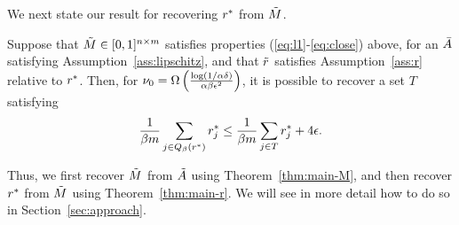 We next state our result for recovering $r^*$ from $\tilde{M}$.
\begin{theorem}
\label{thm:main-r}
Suppose that $\tilde{M} \in [0,1]^{n \times m}$ satisfies properties 
(\ref{eq:l1}-\ref{eq:close}) above, for an $\bar{A}$ satisfying 
Assumption~\ref{ass:lipschitz}, and that $\tilde{r}$ satisfies Assumption~\ref{ass:r} 
relative to $r^*$. Then, for 
$\nu_0 = \Omega\left( \frac{\log(1/\alpha\delta)}{\alpha\beta\epsilon^2} \right)$, 
it is possible to recover a set $T$ satisfying
\[ \frac{1}{\beta m}\sum_{j \in Q_{\beta}(r^*)} r^*_j \leq \frac{1}{\beta m} \sum_{j \in T} r^*_j + 4\epsilon. \]
\end{theorem}
Thus, we first recover $\tilde{M}$ from $\tilde{A}$ using Theorem~\ref{thm:main-M}, and 
then recover $r^*$ from $\tilde{M}$ using Theorem~\ref{thm:main-r}. We will see 
in more detail how to do so in Section~\ref{sec:approach}.
